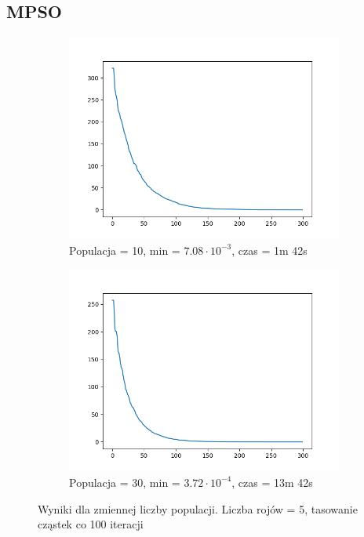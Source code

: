 \documentclass[12pt]{article}
\begin{document}
\subsection{MPSO}
\begin{figure}[H]
    \centering
    \begin{subfigure}{0.49\textwidth}
        \centering
        \includegraphics[width=\linewidth]{plots/MPSO/1_best.png}
        \caption{Populacja = 10, min = $7.08\cdot 10^{-3}$, czas = 1m 42s}
    \end{subfigure}
    \begin{subfigure}{0.49\textwidth}
        \centering
        \includegraphics[width=\linewidth]{plots/MPSO/2_best.png}
        \caption{Populacja = 30, min = $3.72\cdot 10^{-4}$, czas = 13m 42s}
    \end{subfigure}
    \caption{Wyniki dla zmiennej liczby populacji. Liczba rojów = 5, tasowanie cząstek co 100 iteracji}
\end{figure}
\end{document}

